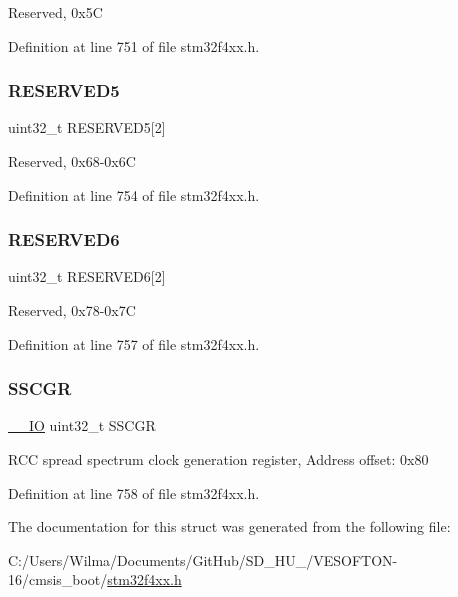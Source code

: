 Reserved, 0x5C 

Definition at line 751 of file stm32f4xx.\+h.

\mbox{\label{struct_r_c_c___type_def_ac0eb05794aeee3b4ed69c8fe54c9be3b}} 
\subsubsection{\texorpdfstring{R\+E\+S\+E\+R\+V\+E\+D5}{RESERVED5}}
{\footnotesize\ttfamily uint32\+\_\+t R\+E\+S\+E\+R\+V\+E\+D5\mbox{[}2\mbox{]}}

Reserved, 0x68-\/0x6C 

Definition at line 754 of file stm32f4xx.\+h.

\mbox{\label{struct_r_c_c___type_def_a10da398d74a1f88d5b42bd40718d9447}} 
\subsubsection{\texorpdfstring{R\+E\+S\+E\+R\+V\+E\+D6}{RESERVED6}}
{\footnotesize\ttfamily uint32\+\_\+t R\+E\+S\+E\+R\+V\+E\+D6\mbox{[}2\mbox{]}}

Reserved, 0x78-\/0x7C 

Definition at line 757 of file stm32f4xx.\+h.

\mbox{\label{struct_r_c_c___type_def_aaef3da59eaf7c6dfdf9a12fd60ce58a8}} 
\subsubsection{\texorpdfstring{S\+S\+C\+GR}{SSCGR}}
{\footnotesize\ttfamily \hyperlink{group___c_m_s_i_s__core__definitions_gaec43007d9998a0a0e01faede4133d6be}{\+\_\+\+\_\+\+IO} uint32\+\_\+t S\+S\+C\+GR}

R\+CC spread spectrum clock generation register, Address offset\+: 0x80 

Definition at line 758 of file stm32f4xx.\+h.



The documentation for this struct was generated from the following file\+:\begin{DoxyCompactItemize}
\item 
C\+:/\+Users/\+Wilma/\+Documents/\+Git\+Hub/\+S\+D\+\_\+\+H\+U\+\_/\+V\+E\+S\+O\+F\+T\+O\+N-\/16/cmsis\+\_\+boot/\hyperlink{stm32f4xx_8h}{stm32f4xx.\+h}\end{DoxyCompactItemize}
